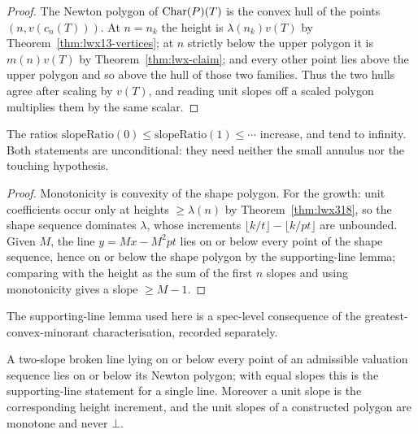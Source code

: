 \begin{proof}
  \leanok
  The Newton polygon of $\operatorname{Char}(P)(T)$ is the convex hull of the points $(n, v(c_n(T)))$.  At
  $n = n_k$ the height is $\lambda(n_k)v(T)$ by Theorem~\ref{thm:lwx13-vertices}; at $n$ strictly
  below the upper polygon it is $m(n)v(T)$ by Theorem~\ref{thm:lwx-claim}; and every other point
  lies above the upper polygon and so above the hull of those two families.  Thus the two hulls
  agree after scaling by $v(T)$, and reading unit slopes off a scaled polygon multiplies them by
  the same scalar.
\end{proof}

\begin{theorem}
  \label{thm:slope-growth}
  \leanok
  The ratios $\mathrm{slopeRatio}(0)\leq\mathrm{slopeRatio}(1)\leq\cdots$ increase, and tend to
  infinity.  Both statements are unconditional: they need neither the small annulus nor the
  touching hypothesis.
\end{theorem}

\begin{proof}
  \leanok
  Monotonicity is convexity of the shape polygon.  For the growth: unit coefficients occur only
  at heights $\geq\lambda(n)$ by Theorem~\ref{thm:lwx318}, so the shape sequence dominates
  $\lambda$, whose increments $\lfloor k/t\rfloor-\lfloor k/pt\rfloor$ are unbounded.  Given $M$,
  the line $y = Mx - M^{2}pt$ lies on or below every point of the shape sequence, hence on or
  below the shape polygon by the supporting-line lemma; comparing with the height as the sum of
  the first $n$ slopes and using monotonicity gives a slope $\geq M-1$.
\end{proof}

The supporting-line lemma used here is a spec-level consequence of the greatest-convex-minorant
characterisation, recorded separately.

\begin{lemma}
  \label{lem:supporting-line}
  \leanok
  A two-slope broken line lying on or below every point of an admissible valuation sequence lies
  on or below its Newton polygon; with equal slopes this is the supporting-line statement for a
  single line.  Moreover a unit slope is the corresponding height increment, and the unit slopes
  of a constructed polygon are monotone and never $\bot$.
\end{lemma}

